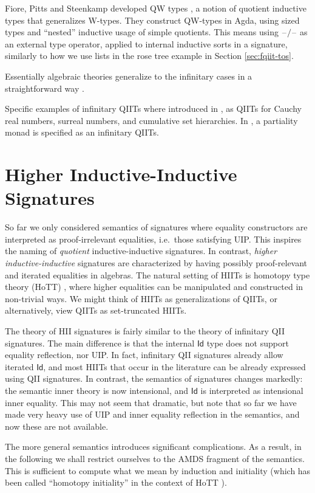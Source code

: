 \documentclass[12pt,a4paper,twoside,openany]{book}
\theoremstyle{remark}
\theoremstyle{definition}
\theoremstyle{theorem}
\newcommand{\Id}{\mathsf{Id}}
\newcommand{\blank}{\mathord{\hspace{1pt}\text{--}\hspace{1pt}}}
\begin{document}
Fiore, Pitts and Steenkamp developed QW types
\cite{inf-qits}, a notion of quotient inductive types that generalizes
W-types. They construct QW-types in Agda, using sized types and ``nested''
inductive usage of simple quotients. This means using $\blank/\blank$ as an
external type operator, applied to internal inductive sorts in a signature,
similarly to how we use lists in the rose tree example in Section
\ref{sec:fqiit-tos}.

Essentially algebraic theories generalize to the infinitary cases in a
straightforward way \cite{adamek1994locally}.

Specific examples of infinitary QIITs where introduced in \cite{hottbook}, as
QIITs for Cauchy real numbers, surreal numbers, and cumulative set hierarchies.
In \cite{partiality}, a partiality monad is specified as an infinitary QIITs.


\chapter{Higher Inductive-Inductive Signatures}
\label{chap:hiit}

So far we only considered semantics of signatures where equality constructors
are interpreted as proof-irrelevant equalities, i.e.\ those satisfying UIP. This
inspires the naming of \emph{quotient} inductive-inductive signatures. In
contrast, \emph{higher inductive-inductive} signatures are characterized by
having possibly proof-relevant and iterated equalities in algebras. The natural
setting of HIITs is homotopy type theory (HoTT) \cite{hottbook}, where higher
equalities can be manipulated and constructed in non-trivial ways. We might
think of HIITs as generalizations of QIITs, or alternatively, view QIITs as
set-truncated HIITs.

The theory of HII signatures is fairly similar to the theory of infinitary QII
signatures. The main difference is that the internal $\Id$ type does not support
equality reflection, nor UIP. In fact, infinitary QII signatures already allow
iterated $\Id$, and most HIITs that occur in the literature can be already
expressed using QII signatures. In contrast, the semantics of signatures changes
markedly: the semantic inner theory is now intensional, and $\Id$ is interpreted
as intensional inner equality. This may not seem that dramatic, but note that so
far we have made very heavy use of UIP and inner equality reflection in the
semantics, and now these are not available.

The more general semantics introduces significant complications. As a result, in
the following we shall restrict ourselves to the AMDS fragment of the semantics.
This is sufficient to compute what we mean by induction and initiality (which
has been called ``homotopy initiality'' in the context of HoTT
\cite{homotopy-initial}).
\end{document}
